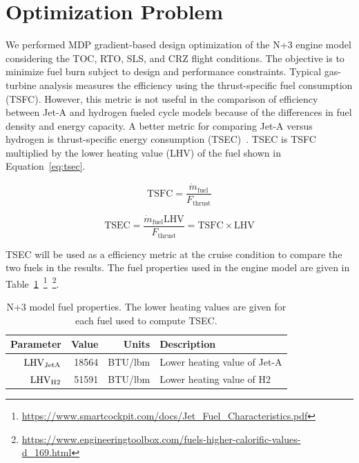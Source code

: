 \documentclass[conf]{new-aiaa}
\begin{document}
\section{Optimization Problem}
\label{sec:optprob}

We performed MDP gradient-based design optimization of the N+3 engine model considering the TOC, RTO, SLS, and CRZ flight conditions.
The objective is to minimize fuel burn subject to design and performance constraints.
Typical gas-turbine analysis measures the efficiency using the thrust-specific fuel consumption (TSFC).
However, this metric is not useful in the comparison of efficiency between Jet-A and hydrogen fueled cycle models because of the differences in fuel density and energy capacity.
A better metric for comparing Jet-A versus hydrogen is thrust-specific energy consumption (TSEC)~\cite{Adler2023}.
TSEC is TSFC multiplied by the lower heating value (LHV) of the fuel shown in Equation~\eqref{eq:tsec}.

\begin{equation}
  \mathrm{TSFC} = \frac{\dot{m}_{\mathrm{fuel}}}{F_{\mathrm{thrust}}}
  \label{eq:tsfc}
\end{equation}

\begin{equation}
  \mathrm{TSEC} = \frac{\dot{m}_{\mathrm{fuel}} \mathrm{LHV}}{F_{\mathrm{thrust}}} = \mathrm{TSFC} \times \mathrm{LHV}
  \label{eq:tsec}
\end{equation}

TSEC will be used as a efficiency metric at the cruise condition to compare the two fuels in the results.
The fuel properties used in the engine model are given in Table~\ref{fuel_props}~\footnote{\url{https://www.smartcockpit.com/docs/Jet_Fuel_Characteristics.pdf}}~\footnote{\url{https://www.engineeringtoolbox.com/fuels-higher-calorific-values-d_169.html}}.

\begin{table}[hbt!]
  \centering
  \caption{
    N+3 model fuel properties.
    The lower heating values are given for each fuel used to compute TSEC.}
  \begin{tabular}{r r r l}
    \hline
    Parameter              & Value & Units        & Description                  \\
    \hline
    $\rm{LHV}_{\rm{JetA}}$ & 18564 & \si{BTU/lbm} & Lower heating value of Jet-A \\
    $\rm{LHV}_{\rm{H2}}$   & 51591 & \si{BTU/lbm} & Lower heating value of H2    \\
    \hline
  \end{tabular}
  \label{fuel_props}
\end{table}
\end{document}
